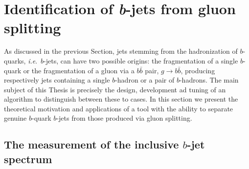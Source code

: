 \section{Identification of {\em b\hspace{0.5mm}}-jets from gluon splitting}\label{sec:gluonsplitting}

As discussed in the previous Section, jets stemming from the hadronization of $b$-quarks, {\em i.e}.\  $b$-jets, can have two possible origins: the fragmentation of a single $b$-quark or the fragmentation of a gluon via a $b\bar{b}$ pair, $g\rightarrow b\bar{b}$, producing respectively jets containing a single $b$-hadron or a pair of $b$-hadrons. The main subject of this Thesis is precisely the design, development ad tuning of an algorithm to distinguish between these to cases. In this section we present the theoretical motivation and applications of a tool with the ability to separate genuine $b$-quark $b$-jets from those produced via gluon splitting. 



%
\subsection{The measurement of the inclusive $b$-jet spectrum}

